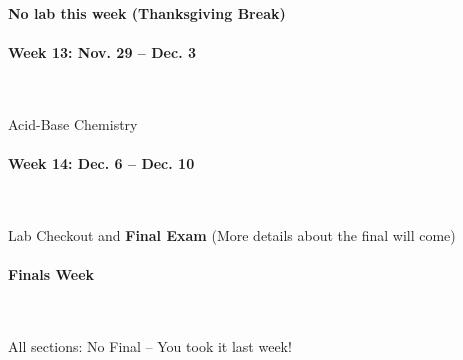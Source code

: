 \documentclass[12pt, letterpaper]{article}
\begin{document}
\textbf{No lab this week (Thanksgiving Break)}

\paragraph{Week 13: Nov. 29 -- Dec. 3}~

Acid-Base Chemistry 

\paragraph{Week 14: Dec. 6 -- Dec. 10}~

Lab Checkout and \textbf{Final Exam} (More details about the final will come)

\paragraph{Finals Week}~

All sections: No Final -- You took it last week!
\end{document}
